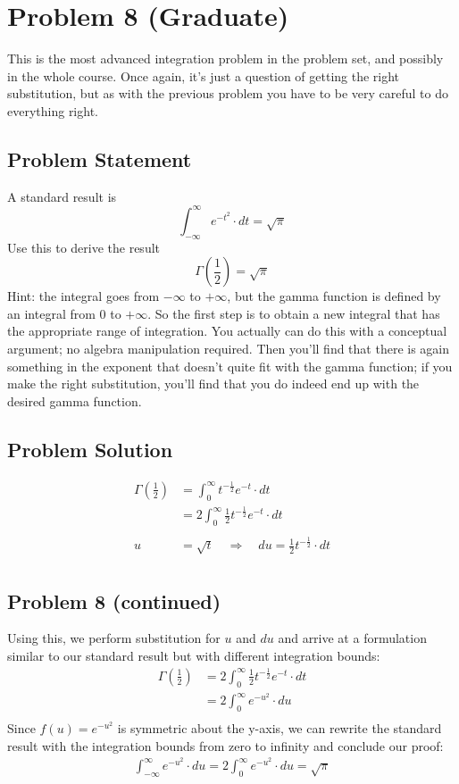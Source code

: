 \documentclass[12pt]{article}
\theoremstyle{definition}
\begin{document}
\newpage
\section*{Problem 8 (Graduate)}

This is the most advanced integration problem in the problem set, and possibly in the whole course. Once again, it's just a question of getting the right substitution, but as with the previous problem you have to be very careful to do everything right.

\subsection*{Problem Statement}

A standard result is
$$
\int_{-\infty}^\infty e^{-t^2} \cdot dt = \sqrt{\pi}
$$
Use this to derive the result
$$
\Gamma \left ( \frac{1}{2} \right ) = \sqrt{\pi}
$$
Hint: the integral goes from $-\infty$ to $+\infty$, but the gamma function is defined by an integral from $0$ to $+\infty$. So the first step is to obtain a new integral that has the appropriate range of integration. You actually can do this with a conceptual argument; no algebra manipulation required. Then you'll find that there is again something in the exponent that doesn't quite fit with the gamma function; if you make the right substitution, you'll find that you do indeed end up with the desired gamma function.

\subsection*{Problem Solution}
\begin{align*}
\Gamma \left ( \frac{1}{2} \right ) &= \int_0^\infty t^{-\frac{1}{2}}e^{-t} \cdot dt\\
&= 2 \int_0^\infty \frac{1}{2}t^{-\frac{1}{2}}e^{-t} \cdot dt\\\\
u &= \sqrt{t} \quad\Rightarrow\quad du = \frac{1}{2}t^{-\frac{1}{2}} \cdot dt\\
\end{align*}

\newpage
\subsection*{Problem 8 (continued)}
Using this, we perform substitution for $u$ and $du$ and arrive at a formulation similar to our standard result but with different integration bounds:
\begin{align*}
\Gamma \left ( \frac{1}{2} \right ) &= 2 \int_0^\infty \frac{1}{2}t^{-\frac{1}{2}}e^{-t} \cdot dt\\
&= 2\int_0^\infty e^{-u^2}\cdot du\\
\end{align*}
Since $f(u) = e^{-u^2}$ is symmetric about the y-axis, we can rewrite the standard result with the integration bounds from zero to infinity and conclude our proof:
\begin{align*}
\int_{-\infty}^\infty e^{-u^2} \cdot du = 2\int_0^\infty e^{-u^2} \cdot du= \sqrt{\pi}
\end{align*}
\end{document}
